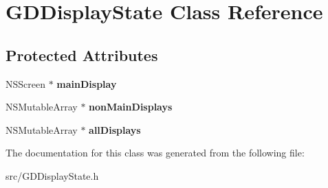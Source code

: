 \hypertarget{interface_g_d_display_state}{
\section{GDDisplayState Class Reference}
\label{interface_g_d_display_state}
}
\subsection*{Protected Attributes}
\begin{DoxyCompactItemize}
\item 
\hypertarget{interface_g_d_display_state_ae29963c0845eab687e9c41390d044b73}{
NSScreen $\ast$ {\bfseries mainDisplay}}
\label{interface_g_d_display_state_ae29963c0845eab687e9c41390d044b73}

\item 
\hypertarget{interface_g_d_display_state_a69414b2f87f27b16908a80b20d4991cc}{
NSMutableArray $\ast$ {\bfseries nonMainDisplays}}
\label{interface_g_d_display_state_a69414b2f87f27b16908a80b20d4991cc}

\item 
\hypertarget{interface_g_d_display_state_a9db1f6fff5ad3bb2d4ca39e8d23b85d1}{
NSMutableArray $\ast$ {\bfseries allDisplays}}
\label{interface_g_d_display_state_a9db1f6fff5ad3bb2d4ca39e8d23b85d1}

\end{DoxyCompactItemize}


The documentation for this class was generated from the following file:\begin{DoxyCompactItemize}
\item 
src/GDDisplayState.h\end{DoxyCompactItemize}
